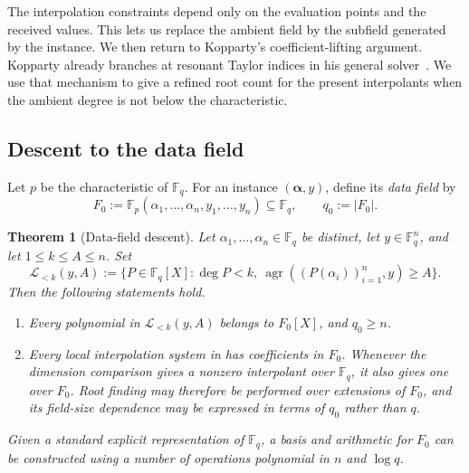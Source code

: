 \documentclass[11pt,letterpaper]{article}
\newtheorem{theorem}{Theorem}[section]
\theoremstyle{definition}
\newcommand{\F}{\mathbb{F}}
\newcommand{\agree}{\operatorname{agr}}
\newcommand{\List}{\mathcal{L}}
\begin{document}
The interpolation constraints depend only on the evaluation points and the
received values. This lets us replace the ambient field by the subfield
generated by the instance. We then return to
Kopparty's coefficient-lifting argument. Kopparty already branches at
resonant Taylor indices in his general solver~\cite[Corollary~4.5]{Kopparty15}.
We use that mechanism to give a refined root count for the present
interpolants when the ambient degree is not below the characteristic.

\subsection{Descent to the data field}

Let \(p\) be the characteristic of \(\F_q\).  For an instance
\((\boldsymbol\alpha,y)\), define its \emph{data field} by
\begin{equation}
  F_0:=\F_p(\alpha_1,\ldots,\alpha_n,y_1,\ldots,y_n)
  \subseteq\F_q,
  \qquad q_0:=|F_0|.
  \label{eq:data-field}
\end{equation}
\begin{theorem}[Data-field descent]
\label{thm:data-field-descent}
Let \(\alpha_1,\ldots,\alpha_n\in\F_q\) be distinct, let
\(y\in\F_q^n\), and let \(1\leq k\leq A\leq n\).  Set
\[
  \List_{<k}(y,A)
  :=
  \{P\in\F_q[X]:\deg P<k,\
      \agree((P(\alpha_i))_{i=1}^n,y)\geq A\}.
\]
Then the following statements hold.
\begin{enumerate}[label=\textup{(\roman*)}]
  \item Every polynomial in \(\List_{<k}(y,A)\) belongs to \(F_0[X]\),
        and \(q_0\geq n\).
  \item Every local interpolation system in
        has coefficients in \(F_0\).  Whenever the dimension comparison
        gives a nonzero interpolant over \(\F_q\), it also gives one over
        \(F_0\).  Root finding may therefore be performed over extensions
        of \(F_0\), and its field-size dependence may be expressed in
        terms of \(q_0\) rather than \(q\).
\end{enumerate}
Given a standard explicit representation of \(\F_q\), a basis and
arithmetic for \(F_0\) can be constructed using a number of operations
polynomial in \(n\) and \(\log q\).
\end{theorem}
\end{document}
